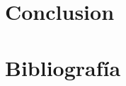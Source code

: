 \documentclass[12pt,a4paper]{article}
\begin{document}
\section{Conclusion}

\section{Bibliografía}

\end{document}
